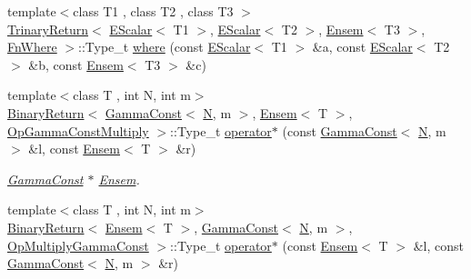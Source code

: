 \begin{DoxyCompactItemize}
\item 
{\footnotesize template$<$class T1 , class T2 , class T3 $>$ }\\\mbox{\hyperlink{structENSEM_1_1TrinaryReturn}{Trinary\+Return}}$<$ \mbox{\hyperlink{classENSEM_1_1EScalar}{E\+Scalar}}$<$ T1 $>$, \mbox{\hyperlink{classENSEM_1_1EScalar}{E\+Scalar}}$<$ T2 $>$, \mbox{\hyperlink{classENSEM_1_1Ensem}{Ensem}}$<$ T3 $>$, \mbox{\hyperlink{structENSEM_1_1FnWhere}{Fn\+Where}} $>$\+::Type\+\_\+t \mbox{\hyperlink{group__eensem_gab6c29ad51b23e921cd47448cfa4eabaa}{where}} (const \mbox{\hyperlink{classENSEM_1_1EScalar}{E\+Scalar}}$<$ T1 $>$ \&a, const \mbox{\hyperlink{classENSEM_1_1EScalar}{E\+Scalar}}$<$ T2 $>$ \&b, const \mbox{\hyperlink{classENSEM_1_1Ensem}{Ensem}}$<$ T3 $>$ \&c)
\item 
{\footnotesize template$<$class T , int N, int m$>$ }\\\mbox{\hyperlink{structENSEM_1_1BinaryReturn}{Binary\+Return}}$<$ \mbox{\hyperlink{classENSEM_1_1GammaConst}{Gamma\+Const}}$<$ \mbox{\hyperlink{operator__name__util_8cc_a7722c8ecbb62d99aee7ce68b1752f337}{N}}, m $>$, \mbox{\hyperlink{classENSEM_1_1Ensem}{Ensem}}$<$ T $>$, \mbox{\hyperlink{structENSEM_1_1OpGammaConstMultiply}{Op\+Gamma\+Const\+Multiply}} $>$\+::Type\+\_\+t \mbox{\hyperlink{group__eensem_gab92286e5b611f00cb8f733f9d41d06a4}{operator$\ast$}} (const \mbox{\hyperlink{classENSEM_1_1GammaConst}{Gamma\+Const}}$<$ \mbox{\hyperlink{operator__name__util_8cc_a7722c8ecbb62d99aee7ce68b1752f337}{N}}, m $>$ \&l, const \mbox{\hyperlink{classENSEM_1_1Ensem}{Ensem}}$<$ T $>$ \&r)
\begin{DoxyCompactList}\small\item\em \mbox{\hyperlink{classENSEM_1_1GammaConst}{Gamma\+Const}} $\ast$ \mbox{\hyperlink{classENSEM_1_1Ensem}{Ensem}}. \end{DoxyCompactList}\item 
{\footnotesize template$<$class T , int N, int m$>$ }\\\mbox{\hyperlink{structENSEM_1_1BinaryReturn}{Binary\+Return}}$<$ \mbox{\hyperlink{classENSEM_1_1Ensem}{Ensem}}$<$ T $>$, \mbox{\hyperlink{classENSEM_1_1GammaConst}{Gamma\+Const}}$<$ \mbox{\hyperlink{operator__name__util_8cc_a7722c8ecbb62d99aee7ce68b1752f337}{N}}, m $>$, \mbox{\hyperlink{structENSEM_1_1OpMultiplyGammaConst}{Op\+Multiply\+Gamma\+Const}} $>$\+::Type\+\_\+t \mbox{\hyperlink{group__eensem_gaada3f84ca5744bafe60557482cc90c26}{operator$\ast$}} (const \mbox{\hyperlink{classENSEM_1_1Ensem}{Ensem}}$<$ T $>$ \&l, const \mbox{\hyperlink{classENSEM_1_1GammaConst}{Gamma\+Const}}$<$ \mbox{\hyperlink{operator__name__util_8cc_a7722c8ecbb62d99aee7ce68b1752f337}{N}}, m $>$ \&r)

\end{DoxyCompactItemize}
